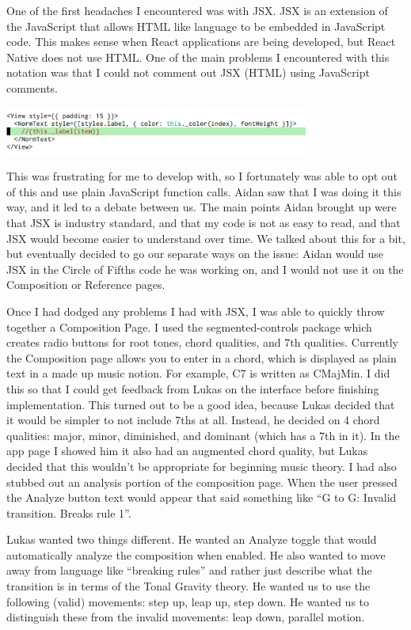 \documentclass[onecolumn, draftclsnofoot,10pt, compsoc]{IEEEtran}
\begin{document}
One of the first headaches I encountered was with JSX.
JSX is an extension of the JavaScript that allows HTML like language to be embedded in JavaScript code.
This makes sense when React applications are being developed, but React Native does not use HTML.
One of the main problems I encountered with this notation was that I could not comment out JSX (HTML) using JavaScript comments.

\includegraphics[width=0.75\textwidth]{jsx-comment}

This was frustrating for me to develop with, so I fortunately was able to opt out of this and use plain JavaScript function calls.
Aidan saw that I was doing it this way, and it led to a debate between us.
The main points Aidan brought up were that JSX is industry standard, and that my code is not as easy to read, and that JSX would become easier to understand over time.
We talked about this for a bit, but eventually decided to go our separate ways on the issue: Aidan would use JSX in the Circle of Fifths code he was working on, and I would not use it on the Composition or Reference pages.

Once I had dodged any problems I had with JSX, I was able to quickly throw together a Composition Page.
I used the segmented-controls package which creates radio buttons for root tones, chord qualities, and 7th qualities.
Currently the Composition page allows you to enter in a chord, which is displayed as plain text in a made up music notion.
For example, C7 is written as CMajMin.
I did this so that I could get feedback from Lukas on the interface before finishing implementation.
This turned out to be a good idea, because Lukas decided that it would be simpler to not include 7ths at all.
Instead, he decided on 4 chord qualities: major, minor, diminished, and dominant (which has a 7th in it).
In the app page I showed him it also had an augmented chord quality, but Lukas decided that this wouldn’t be appropriate for beginning music theory.
I had also stubbed out an analysis portion of the composition page.
When the user pressed the Analyze button text would appear that said something like “G to G: Invalid transition. Breaks rule 1”.

Lukas wanted two things different.
He wanted an Analyze toggle that would automatically analyze the composition when enabled.
He also wanted to move away from language like “breaking rules” and rather just describe what the transition is in terms of the Tonal Gravity theory.
He wanted us to use the following (valid) movements: step up, leap up, step down.
He wanted us to distinguish these from the invalid movements: leap down, parallel motion.
\end{document}
